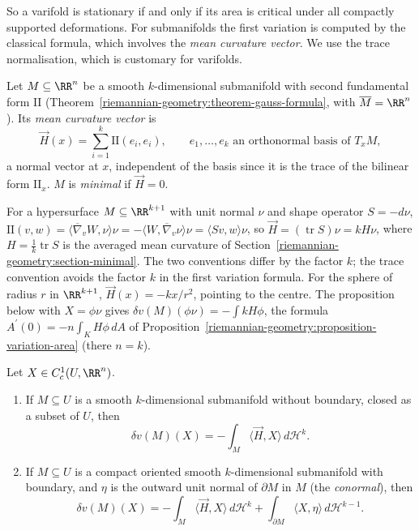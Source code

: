 So a varifold is stationary if and only if its area is critical under all compactly supported deformations. For submanifolds the first variation is computed by the classical formula, which involves the
\emph{mean curvature vector}. We use the trace normalisation, which is customary for varifolds.

\begin{definition}\label{currents:definition-mean-curvature-vector}
Let $M \subseteq \RR^n$ be a smooth $k$-dimensional submanifold with second fundamental form $\mathrm{II}$ (Theorem~\ref{riemannian-geometry:theorem-gauss-formula}, with $\overline{M} = \RR^n$). Its \emph{mean
curvature vector} is
\[
\vec{H}(x) = \sum_{i=1}^k\mathrm{II}(e_i, e_i), \qquad e_1, \ldots, e_k \text{ an orthonormal basis of } T_xM,
\]
a normal vector at $x$, independent of the basis since it is the trace of the bilinear form $\mathrm{II}_x$. $M$ is \emph{minimal} if $\vec{H} = 0$.
\end{definition}

\begin{remark}\label{currents:remark-mean-curvature-conventions}
For a hypersurface $M \subseteq \RR^{k+1}$ with unit normal $\nu$ and shape operator $S = -d\nu$, $\mathrm{II}(v, w) = \langle\overline{\nabla}_vW, \nu\rangle\nu = -\langle W, \overline{\nabla}_v\nu\rangle\nu = \langle Sv, w\rangle\nu$, so
$\vec{H} = (\operatorname{tr}S)\nu = kH\nu$, where $H = \frac1k\operatorname{tr}S$ is the averaged mean curvature of Section~\ref{riemannian-geometry:section-minimal}. The two conventions differ by the factor $k$;
the trace convention avoids the factor $k$ in the first variation formula. For the sphere of radius $r$ in $\RR^{k+1}$, $\vec{H}(x) = -kx/r^2$, pointing to the centre. The proposition below with $X = \phi\nu$
gives $\delta v(M)(\phi\nu) = -\int kH\phi$, the formula $A^{\prime}(0) = -n\int_KH\phi\,dA$ of Proposition~\ref{riemannian-geometry:proposition-variation-area} (there $n = k$).
\end{remark}

\begin{proposition}\label{currents:proposition-first-variation-submanifold}
Let $X \in C^1_c(U, \RR^n)$.
\begin{enumerate}
\item If $M \subseteq U$ is a smooth $k$-dimensional submanifold without boundary, closed as a subset of $U$, then
\[
\delta v(M)(X) = -\int_M\langle\vec{H}, X\rangle\,d\mathcal{H}^k .
\]
\item If $M \subseteq U$ is a compact oriented smooth $k$-dimensional submanifold with boundary, and $\eta$ is the outward unit normal of $\partial M$ in $M$ (the \emph{conormal}), then
\[
\delta v(M)(X) = -\int_M\langle\vec{H}, X\rangle\,d\mathcal{H}^k + \int_{\partial M}\langle X, \eta\rangle\,d\mathcal{H}^{k-1} .
\]
\end{enumerate}
\end{proposition}

